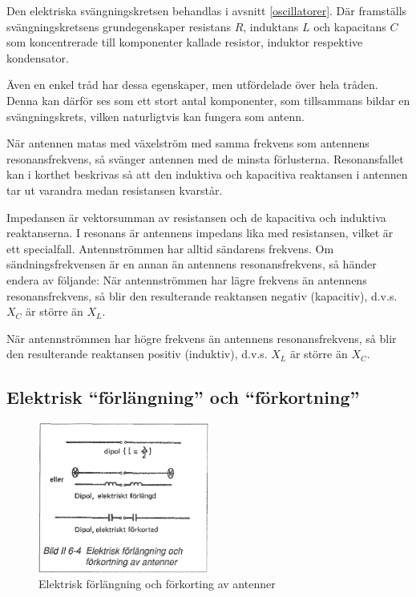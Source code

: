 Den elektriska svängningskretsen behandlas i avsnitt \ref{oscillatorer}. Där framställs
svängningskretsens grundegenskaper resistans \(R\), induktans \(L\)
och kapacitans \(C\) som koncentrerade till komponenter kallade
resistor, induktor respektive kondensator.

Även en enkel tråd har dessa egenskaper, men utfördelade över hela
tråden. Denna kan därför ses som ett stort antal komponenter, som
tillsammans bildar en svängningskrets, vilken naturligtvis kan fungera
som antenn.

När antennen matas med växelström med samma frekvens som antennens
resonansfrekvens, så svänger antennen med de minsta
förlusterna. Resonansfallet kan i korthet beskrivas så att den
induktiva och kapacitiva reaktansen i antennen tar ut varandra medan
resistansen kvarstår.

Impedansen är vektorsumman av resistansen och de kapacitiva och
induktiva reaktanserna. I resonans är antennens impedans lika med
resistansen, vilket är ett specialfall. Antennströmmen har alltid
sändarens frekvens. Om sändningsfrekvensen är en annan än antennens
resonansfrekvens, så händer endera av följande: När antennströmmen har
lägre frekvens än antennens resonansfrekvens, så blir den resulterande
reaktansen negativ (kapacitiv), d.v.s. \(X_C\) är större än \(X_L\).

När antennströmmen har högre frekvens än antennens resonansfrekvens,
så blir den resulterande reaktansen positiv (induktiv), d.v.s. \(X_L\)
är större än \(X_C\).

\subsection{Elektrisk ``förlängning'' och ``förkortning''}

\begin{figure}
  \includegraphics[width=0.5\textwidth]{images/bild_2_6-04}
  \caption{Elektrisk förlängning och förkorting av antenner}
  \label{fig:bildII6-4}
\end{figure}

